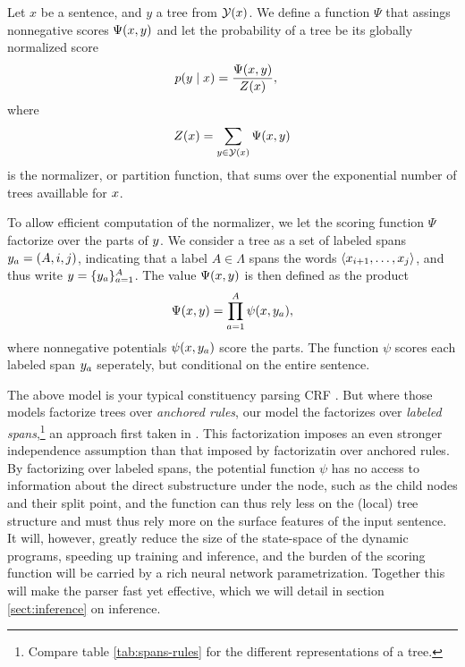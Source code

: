     Let $x$ be a sentence, and $y$ a tree from $\mathcal{Y}(x)$. We define a function $\Psi$ that assings nonnegative scores $\Psi(x, y)$ and let the probability of a tree be its globally normalized score
    \begin{align}
      \label{eq:crf-model}
      p(y \mid x) &= \frac{\Psi(x, y)}{Z(x)},
    \end{align}
    where
    \begin{align*}
      Z(x) = \sum_{ y \in \mathcal{Y}(x) } \Psi(x, y)
    \end{align*}
    is the normalizer, or partition function, that sums over the exponential number of trees availlable for $x$.

    To allow efficient computation of the normalizer, we let the scoring function $\Psi$ factorize over the parts of $y$. We consider a tree as a set of labeled spans $y_a = (A, i, j)$, indicating that a label $A \in \Lambda$ spans the words $\langle x_{i+1}, \dots, x_j \rangle$, and thus write $y = \{ y_a \}_{a=1}^A$. The value $\Psi(x, y)$ is then defined as the product
    \begin{align}
      \Psi(x, y) = \prod_{a=1}^A \psi(x, y_a),
    \end{align}
    where nonnegative potentials $\psi(x, y_a)$ score the parts. The function $\psi$ scores each labeled span $y_a$ seperately, but conditional on the entire sentence.

    The above model is your typical constituency parsing CRF \citep{finkel2008crf,klein2015crf}. But where those models factorize trees over \textit{anchored rules}, our model the factorizes over \textit{labeled spans},\footnote{Compare table \ref{tab:spans-rules} for the different representations of a tree.} an approach first taken in \citet{stern2017minimal}. This factorization imposes an even stronger independence assumption than that imposed by factorizatin over anchored rules. By factorizing over labeled spans, the potential function $\psi$ has no access to information about the direct substructure under the node, such as the child nodes and their split point, and the function can thus rely less on the (local) tree structure and must thus rely more on the surface features of the input sentence. It will, however, greatly reduce the size of the state-space of the dynamic programs, speeding up training and inference, and the burden of the scoring function will be carried by a rich neural network parametrization. Together this will make the parser fast yet effective, which we will detail in section \ref{sect:inference} on inference.

